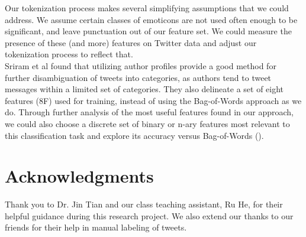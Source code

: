\documentclass[letterpaper]{article}
\begin{document}
Our tokenization process makes several simplifying assumptions that we could address. We assume certain classes of emoticons are not used often enough to be significant, and leave punctuation out of our feature set. We could measure the presence of these (and more) features on Twitter data and adjust our tokenization process to reflect that.\\

Sriram et al found that utilizing author profiles provide a good method for further disambiguation of tweets into categories, as authors tend to tweet messages within a limited set of categories. They also delineate a set of eight features (8F) used for training, instead of using the Bag-of-Words approach as we do. Through further analysis of the most useful features found in our approach, we could also choose a discrete set of binary or n-ary features most relevant to this classification task and explore its accuracy versus Bag-of-Words (\citeauthor{Sriram:2010:STC:1835449.1835643}).

\section{ Acknowledgments}
Thank you to Dr. Jin Tian and our class teaching assistant, Ru He, for their helpful guidance during this research project. We also extend our thanks to our friends for their help in manual labeling of tweets.





\end{document}
